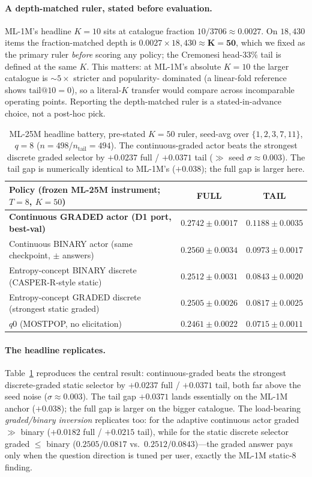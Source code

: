 \documentclass[11pt]{article}
\begin{document}
\paragraph{A depth-matched ruler, stated before evaluation.} ML-1M's headline $K{=}10$ sits at catalogue fraction
$10/3706\approx0.0027$. On $18{,}430$ items the fraction-matched depth is $0.0027\times18{,}430\approx\mathbf{K{=}50}$,
which we fixed as the primary ruler \emph{before} scoring any policy; the Cremonesi head-$33\%$ tail is defined at the
same $K$. This matters: at ML-1M's absolute $K{=}10$ the larger catalogue is ${\sim}5\times$ stricter and popularity-
dominated (a linear-fold reference shows $\mathrm{tail@10}{=}0$), so a literal-$K$ transfer would compare across
incomparable operating points. Reporting the depth-matched ruler is a stated-in-advance choice, not a post-hoc pick.

\begin{table}[h]\centering
\begin{tabular}{lcc}
\toprule
Policy (frozen ML-25M instrument; $T{=}8$, $K{=}50$) & FULL & TAIL \\
\midrule
\textbf{Continuous GRADED actor (D1 port, best-val)} & $\mathbf{0.2742\pm0.0017}$ & $\mathbf{0.1188\pm0.0035}$ \\
Continuous BINARY actor (same checkpoint, $\pm$ answers) & $0.2560\pm0.0034$ & $0.0973\pm0.0017$ \\
Entropy-concept BINARY discrete (CASPER-R-style static) & $0.2512\pm0.0031$ & $0.0843\pm0.0020$ \\
Entropy-concept GRADED discrete (strongest static graded) & $0.2505\pm0.0026$ & $0.0817\pm0.0025$ \\
$q0$ (MOSTPOP, no elicitation) & $0.2461\pm0.0022$ & $0.0715\pm0.0011$ \\
\bottomrule
\end{tabular}
\caption{ML-25M headline battery, pre-stated $K{=}50$ ruler, seed-avg over $\{1,2,3,7,11\}$, $q{=}8$
($n{=}498$/$n_{\text{tail}}{=}494$). The continuous-graded actor beats the strongest discrete graded selector by
$\mathbf{+0.0237}$ full / $\mathbf{+0.0371}$ tail ($\gg$ seed $\sigma\approx0.003$). The tail gap is numerically
identical to ML-1M's ($+0.038$); the full gap is larger here.}\label{tab:ml25m_main}
\end{table}

\paragraph{The headline replicates.} Table~\ref{tab:ml25m_main} reproduces the central result: continuous-graded beats
the strongest discrete-graded static selector by $+0.0237$ full / $+0.0371$ tail, both far above the seed noise
($\sigma\approx0.003$). The tail gap $+0.0371$ lands essentially on the ML-1M anchor ($+0.038$); the full gap is larger
on the bigger catalogue. The load-bearing \emph{graded/binary inversion} replicates too: for the adaptive continuous
actor graded $\gg$ binary ($+0.0182$ full / $+0.0215$ tail), while for the static discrete selector graded $\le$ binary
($0.2505/0.0817$ vs.\ $0.2512/0.0843$)---the graded answer pays only when the question direction is tuned per user,
exactly the ML-1M static-8 finding.
\end{document}
